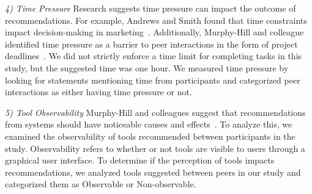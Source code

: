 \textit{4) Time Pressure} Research suggests time pressure can impact the outcome of recommendations. For example, 
Andrews and Smith found that time constraints impact decision-making 
in marketing~\cite{AndrewsTimePressure}. 
Additionally, Murphy-Hill and colleague identified time pressure as a barrier to peer interactions in the form of project deadlines~\cite{Murphy-Hill2015HowDoUsers}. 
We did not strictly enforce a time limit for completing tasks in this study, but the suggested time was one hour. We measured time pressure by looking for statements 
mentioning time from participants and categorized peer interactions as either having time pressure or not.


\textit{5) Tool Observability} Murphy-Hill and colleagues suggest that recommendations from 
systems should have noticeable causes and effects~\cite{Murphy-Hill2015HowDoUsers}. 
To analyze this, we examined the observability of tools recommended between participants in the study. Observability refers to whether or not tools are visible to users through a graphical user interface. To determine if the perception of tools impacts recommendations, we analyzed tools suggested between peers in our study and categorized them as Observable or Non-observable. 

